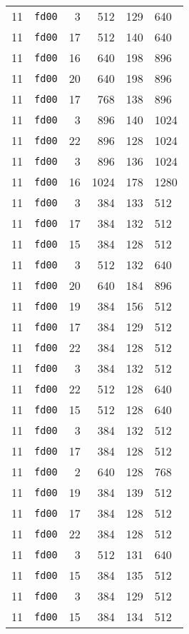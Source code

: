 \documentclass{article}
\begin{document}
\begin{table}[h!]
\begin{tabular}{llrrrl}
    11 & \texttt{fd00} & 3 & 512 & 129 & 640 \\
    11 & \texttt{fd00} & 17 & 512 & 140 & 640 \\
    11 & \texttt{fd00} & 16 & 640 & 198 & 896 \\
    11 & \texttt{fd00} & 20 & 640 & 198 & 896 \\
    11 & \texttt{fd00} & 17 & 768 & 138 & 896 \\
    11 & \texttt{fd00} & 3 & 896 & 140 & 1024 \\
    11 & \texttt{fd00} & 22 & 896 & 128 & 1024 \\
    11 & \texttt{fd00} & 3 & 896 & 136 & 1024 \\
    11 & \texttt{fd00} & 16 & 1024 & 178 & 1280 \\
    11 & \texttt{fd00} & 3 & 384 & 133 & 512 \\
    11 & \texttt{fd00} & 17 & 384 & 132 & 512 \\
    11 & \texttt{fd00} & 15 & 384 & 128 & 512 \\
    11 & \texttt{fd00} & 3 & 512 & 132 & 640 \\
    11 & \texttt{fd00} & 20 & 640 & 184 & 896 \\
    11 & \texttt{fd00} & 19 & 384 & 156 & 512 \\
    11 & \texttt{fd00} & 17 & 384 & 129 & 512 \\
    11 & \texttt{fd00} & 22 & 384 & 128 & 512 \\
    11 & \texttt{fd00} & 3 & 384 & 132 & 512 \\
    11 & \texttt{fd00} & 22 & 512 & 128 & 640 \\
    11 & \texttt{fd00} & 15 & 512 & 128 & 640 \\
    11 & \texttt{fd00} & 3 & 384 & 132 & 512 \\
    11 & \texttt{fd00} & 17 & 384 & 128 & 512 \\
    11 & \texttt{fd00} & 2 & 640 & 128 & 768 \\
    11 & \texttt{fd00} & 19 & 384 & 139 & 512 \\
    11 & \texttt{fd00} & 17 & 384 & 128 & 512 \\
    11 & \texttt{fd00} & 22 & 384 & 128 & 512 \\
    11 & \texttt{fd00} & 3 & 512 & 131 & 640 \\
    11 & \texttt{fd00} & 15 & 384 & 135 & 512 \\
    11 & \texttt{fd00} & 3 & 384 & 129 & 512 \\
    11 & \texttt{fd00} & 15 & 384 & 134 & 512 \\

\end{tabular}
\end{table}
\end{document}
